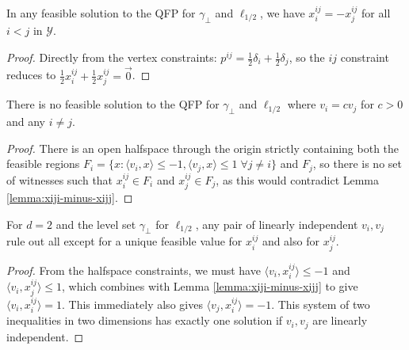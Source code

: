 \documentclass[anon]{colt2020} %
\newcommand{\Y}{\mathcal{Y}}
\newcommand{\inprod}[2]{\langle #1, #2 \rangle}%
\begin{document}
\begin{lemma} \label{lemma:xiji-minus-xijj}
	In any feasible solution to the QFP for $\gamma_{\bot}$ and $\ell_{1/2}$, we have $x^{ij}_i = -x^{ij}_j$ for all $i<j$ in $\Y$.
\end{lemma}
\begin{proof}
	Directly from the vertex constraints: $p^{ij} = \frac{1}{2}\delta_i + \frac{1}{2}\delta_j$, so the $ij$ constraint reduces to $\frac{1}{2}x^{ij}_i + \frac{1}{2}x^{ij}_j = \vec 0$.
\end{proof}

\begin{lemma} \label{lemma:vi-neq-cvj}
	There is no feasible solution to the QFP for $\gamma_{\bot}$ and $\ell_{1/2}$ where $v_i = c v_j$ for $c > 0$ and any $i \neq j$.
\end{lemma}
\begin{proof}
	There is an open halfspace through the origin strictly containing both the feasible regions $F_i = \{x : \inprod{v_i}{x} \leq -1, \inprod{v_j}{x} \leq 1 \; \forall j \neq i\}$ and $F_j$, so there is no set of witnesses such that $x^{ij}_i \in F_i$ and $x^{ij}_j \in F_j$, as this would contradict Lemma \ref{lemma:xiji-minus-xijj}.
\end{proof}

\begin{lemma} \label{lemma:unique-spot-xiji}
	For $d=2$ and the level set $\gamma_\bot$ for $\ell_{1/2}$, any pair of linearly independent $v_i,v_j$ rule out all except for a unique feasible value for $x^{ij}_i$ and also for $x^{ij}_j$.
\end{lemma}
\begin{proof}
	From the halfspace constraints, we must have $\inprod{v_i}{x^{ij}_i} \leq -1$ and $\inprod{v_i}{x^{ij}_j} \leq 1$, which combines with Lemma \ref{lemma:xiji-minus-xijj} to give $\inprod{v_i}{x^{ij}_i} = 1$.
	This immediately also gives $\inprod{v_j}{x^{ij}_i} = -1$.
	This system of two inequalities in two dimensions has exactly one solution if $v_i,v_j$ are linearly independent.
\end{proof}
\end{document}
